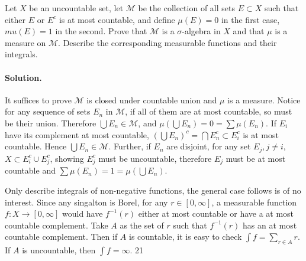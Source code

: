 \documentclass[../main.tex]{subfiles}
\begin{document}
\begin{exercise}
  Let $ X $ be an uncountable set, let $ \mathcal{M} $ be the collection of all sets $ E \subset X $ such that either $ E $ or $ E^c $ is at most countable, and define $ \mu(E) = 0 $ in the first case, $ mu(E) = 1 $ in the second. Prove that $ \mathcal{M} $ is a $ \sigma $-algebra in $ X $ and that $ \mu $ is a measure on $ \mathcal{M} $. Describe the corresponding measurable functions and their integrals.

  \paragraph{Solution. }
  It suffices to prove $ \mathcal{M} $ is closed under countable union and $ \mu $ is a measure. Notice for any sequence of sets $ E_n $ in $ \mathcal{M} $, if all of them are at most countable, so must be their union. Therefore $ \bigcup E_n \in \mathcal{M} $, and $ \mu(\bigcup E_n) = 0 = \sum \mu(E_n) $. If $ E_i $ have its complement at most countable, $ \left (\bigcup E_n \right )^c = \bigcap E_n^c \subset E_i^c$ is at most countable. Hence $ \bigcup E_n \in \mathcal{M} $.
  Further, if $ E_n $ are disjoint, for any set $ E_j, j \ne i $, $ X \subset E_i^c \cup E_j^c $, showing $ E_j^c $ must be uncountable, therefore $ E_j $ must be at most countable and $ \sum \mu(E_n) = 1 = \mu \left (\bigcup E_n \right ) $.

  Only describe integrals of non-negative functions, the general case follows is of no interest. Since any singalton is Borel, for any $ r \in [0, \infty] $, a measurable function $ f: X \to [0, \infty] $ would have $ f ^{-1}(r) $ either at most countable or have a at most countable complement. Take $ A $ as the set of $ r $ such that $ f ^{-1}(r)  $ has an at most countable complement. Then if $ A $ is countable, it is easy to check $ \int f = \sum _{r \in A} r  $. If $ A $ is uncountable, then $ \int f = \infty $. 21


\end{exercise}
\end{document}
